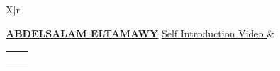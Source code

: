 \documentclass{resume}
\begin{document}
\begin{tabularx}{\textwidth}{X|r}
	
	{\LARGE\MakeUppercase{\bf \href{https://www.youtube.com/watch?v=8wwv_bj3Hvc}{Abdelsalam ElTamawy}}}
	{\small\href{https://www.youtube.com/watch?v=8wwv_bj3Hvc}{Self Introduction Video \iconin{\faYoutubePlay}}}
	&
	\small{
		\begin{tabular}{ll}
			\href{mailto:solomspd@aucegypt.edu}{\iconanot{\faEnvelope}{solomspd@aucegypt.edu}} & \href{tel:+0201003435365}{\iconanot{\faPhone}{(+02)01003435365}} \\
			\href{https://github.com/solomspd}{\iconanot{\faGithub}{github.com/solomspd}} & \iconanot{\faMapMarker}{Nasr City, Cairo, Egypt} \\
			\multicolumn{2}{l}{\href{https://linkedin.com/in/abdelsalam-et}{\iconanot{\faLinkedin}{linkedin.com/in/abdelsalam-et}}} \\
		\end{tabular}
	}
\end{tabularx}

\end{document}
